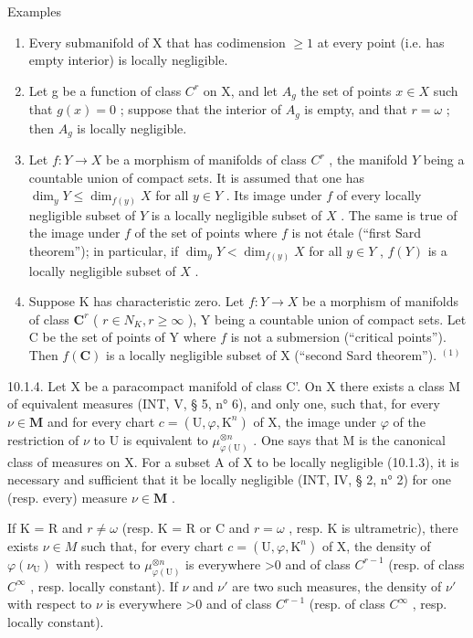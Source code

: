 Examples

\begin{enumerate}
\def\labelenumi{\alph{enumi})}
\item
  Every submanifold of X that has codimension \(\geqslant1\) at every point (i.e. has empty interior) is locally negligible.
\item
  Let g be a function of class \(C^{r}\) on X, and let \(A_{g}\) the set of points \(x \in X\) such that \(g(x) = 0\) ; suppose that the interior of \(A_{g}\) is empty, and that \(r = \omega\) ; then \(A_{g}\) is locally negligible.
\item
  Let \(f: Y \to X\) be a morphism of manifolds of class \(C^{r}\) , the manifold \(Y\) being a countable union of compact sets. It is assumed that one has \(\dim_{y} Y \leqslant \dim_{f(y)} X\) for all \(y \in Y\) . Its image under \(f\) of every locally negligible subset of \(Y\) is a locally negligible subset of \(X\) . The same is true of the image under \(f\) of the set of points where \(f\) is not étale (“first Sard theorem”); in particular, if \(\dim_{y} Y < \dim_{f(y)} X\) for all \(y \in Y\) , \(f(Y)\) is a locally negligible subset of \(X\) .
\item
  Suppose K has characteristic zero. Let \(f\colon Y\to X\) be a morphism of manifolds of class \(\mathbf{C}^{r}\) ( \(r\in N_{K}, r\geqslant\infty\) ), Y being a countable union of compact sets. Let C be the set of points of Y where \(f\) is not a submersion (“critical points”). Then \(f(\mathbf{C})\) is a locally negligible subset of X (“second Sard theorem”). \(^{(1)}\)
\end{enumerate}

10.1.4. Let X be a paracompact manifold of class C'. On X there exists a class M of equivalent measures (INT, V, § 5, n° 6), and only one, such that, for every \(\nu \in \mathbf{M}\) and for every chart \(c = (\mathrm{U}, \varphi, \mathrm{K}^n)\) of X, the image under \(\varphi\) of the restriction of \(\nu\) to U is equivalent to \(\mu_{\varphi(\mathrm{U})}^{\otimes n}\) . One says that M is the canonical class of measures on X. For a subset A of X to be locally negligible (10.1.3), it is necessary and sufficient that it be locally negligible (INT, IV, § 2, n° 2) for one (resp. every) measure \(\nu \in \mathbf{M}\) .

If K = R and \(r \neq \omega\) (resp. K = R or C and \(r = \omega\) , resp. K is ultrametric), there exists \(\nu \in M\) such that, for every chart \(c = (\mathrm{U}, \varphi, \mathrm{K}^{n})\) of X, the density of \(\varphi(\nu_{\mathrm{U}})\) with respect to \(\mu_{\varphi(\mathrm{U})}^{\otimes n}\) is everywhere \textgreater0 and of class \(C^{r-1}\) (resp. of class \(C^{\infty}\) , resp. locally constant). If \(\nu\) and \(\nu'\) are two such measures, the density of \(\nu'\) with respect to \(\nu\) is everywhere \textgreater0 and of class \(C^{r-1}\) (resp. of class \(C^{\infty}\) , resp. locally constant).


